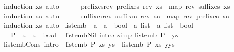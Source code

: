 \begin{isabellebody}
\isamarkupfalse%
\ {\isacharparenleft}induction\ xs{\isacharparenright}\ auto%
\endisatagproof
{\isafoldproof}%
%
\isadelimproof
\isanewline
%
\endisadelimproof
\ \ \ \ \isanewline
{}\isamarkupfalse%
\ prefixes{\isacharunderscore}rev{\isacharcolon}\ {\isachardoublequoteopen}prefixes\ {\isacharparenleft}rev\ xs{\isacharparenright}\ {\isacharequal}\ map\ rev\ {\isacharparenleft}suffixes\ xs{\isacharparenright}{\isachardoublequoteclose}\isanewline
%
\isadelimproof
\ \ %
\endisadelimproof
%
\isatagproof
{}\isamarkupfalse%
\ {\isacharparenleft}induction\ xs{\isacharparenright}\ auto%
\endisatagproof
{\isafoldproof}%
%
\isadelimproof
\isanewline
%
\endisadelimproof
\ \ \ \ \isanewline
{}\isamarkupfalse%
\ suffixes{\isacharunderscore}rev{\isacharcolon}\ {\isachardoublequoteopen}suffixes\ {\isacharparenleft}rev\ xs{\isacharparenright}\ {\isacharequal}\ map\ rev\ {\isacharparenleft}prefixes\ xs{\isacharparenright}{\isachardoublequoteclose}\isanewline
%
\isadelimproof
\ \ %
\endisadelimproof
%
\isatagproof
{}\isamarkupfalse%
\ {\isacharparenleft}induction\ xs{\isacharparenright}\ auto%
\endisatagproof
{\isafoldproof}%
%
\isadelimproof
%
\endisadelimproof
%
\isadelimdocument
%
\endisadelimdocument
%
\isatagdocument
%
\isamarkuptrue%
%
\endisatagdocument
{\isafolddocument}%
%
\isadelimdocument
%
\endisadelimdocument
{}\isamarkupfalse%
\ list{\isacharunderscore}emb\ {\isacharcolon}{\isacharcolon}\ {\isachardoublequoteopen}{\isacharparenleft}{\isacharprime}a\ {\isasymRightarrow}\ {\isacharprime}a\ {\isasymRightarrow}\ bool{\isacharparenright}\ {\isasymRightarrow}\ {\isacharprime}a\ list\ {\isasymRightarrow}\ {\isacharprime}a\ list\ {\isasymRightarrow}\ bool{\isachardoublequoteclose}\isanewline
\ \ \ P\ {\isacharcolon}{\isacharcolon}\ {\isachardoublequoteopen}{\isacharparenleft}{\isacharprime}a\ {\isasymRightarrow}\ {\isacharprime}a\ {\isasymRightarrow}\ bool{\isacharparenright}{\isachardoublequoteclose}\isanewline
{}\isanewline
\ \ list{\isacharunderscore}emb{\isacharunderscore}Nil\ {\isacharbrackleft}intro{\isacharcomma}\ simp{\isacharbrackright}{\isacharcolon}\ {\isachardoublequoteopen}list{\isacharunderscore}emb\ P\ {\isacharbrackleft}{\isacharbrackright}\ ys{\isachardoublequoteclose}\isanewline
{\isacharbar}\ list{\isacharunderscore}emb{\isacharunderscore}Cons\ {\isacharbrackleft}intro{\isacharbrackright}\ {\isacharcolon}\ {\isachardoublequoteopen}list{\isacharunderscore}emb\ P\ xs\ ys\ {\isasymLongrightarrow}\ list{\isacharunderscore}emb\ P\ xs\ {\isacharparenleft}y{\isacharhash}ys{\isacharparenright}{\isachardoublequoteclose}\isanewline

\end{isabellebody}

